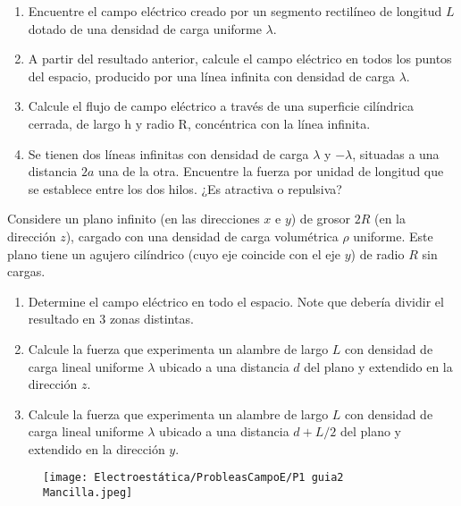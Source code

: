 \np
\begin{enumerate}[label=\alph*)]
    \item Encuentre el campo eléctrico creado por un segmento rectilíneo de longitud $L$ dotado de una densidad de carga uniforme $\lambda$.
    \item A partir del resultado anterior, calcule el campo eléctrico en todos los puntos del espacio, producido por una línea infinita con densidad de carga $\lambda$.
    \item Calcule el flujo de campo eléctrico a través de una superficie cilíndrica cerrada, de largo h y radio R, concéntrica con la línea infinita.
    \item  Se tienen dos líneas infinitas con densidad de carga $\lambda$ y $-\lambda$, situadas a una distancia $2a$ una de la otra. Encuentre la fuerza por unidad de longitud que se establece entre los dos hilos. ¿Es atractiva o repulsiva?
\end{enumerate}
\newpage
\np
Considere un plano infinito (en las direcciones $x$ e $y$) de grosor $2R$ (en la dirección $z$), cargado con una densidad de carga volumétrica $\rho$ uniforme. Este plano tiene un agujero cilíndrico (cuyo eje coincide con el eje $y$) de radio $R$ sin cargas.
\begin{enumerate}[label=\alph*)]
    \item Determine el campo eléctrico en todo el espacio. Note que debería dividir el resultado en 3 zonas distintas.
    \item Calcule la fuerza que experimenta un alambre de largo $L$ con densidad de carga lineal uniforme $\lambda$ ubicado a una distancia $d$ del plano y extendido en la dirección $z$.
    \item Calcule la fuerza que experimenta un alambre de largo $L$ con densidad de carga lineal uniforme $\lambda$ ubicado a una distancia $d+L/2$ del plano y extendido en la dirección $y$.
\end{enumerate}

\begin{figure}[h]
    \centering
    \texttt{[image: Electroestática/ProbleasCampoE/P1 guia2 Mancilla.jpeg]}
    \label{fig:P1G2M}
\end{figure}


